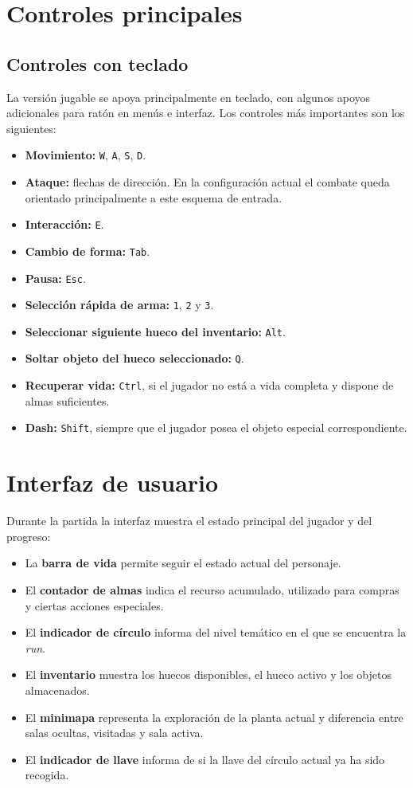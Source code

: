 \section{Controles principales}
\subsection{Controles con teclado}
La versión jugable se apoya principalmente en teclado, con algunos apoyos adicionales para
ratón en menús e interfaz. Los controles más importantes son los siguientes:

\begin{itemize}
    \item \textbf{Movimiento:} \texttt{W}, \texttt{A}, \texttt{S}, \texttt{D}.
    \item \textbf{Ataque:} flechas de dirección. En la configuración actual el combate queda orientado principalmente a este esquema de entrada.
    \item \textbf{Interacción:} \texttt{E}.
    \item \textbf{Cambio de forma:} \texttt{Tab}.
    \item \textbf{Pausa:} \texttt{Esc}.
    \item \textbf{Selección rápida de arma:} \texttt{1}, \texttt{2} y \texttt{3}.
    \item \textbf{Seleccionar siguiente hueco del inventario:} \texttt{Alt}.
    \item \textbf{Soltar objeto del hueco seleccionado:} \texttt{Q}.
    \item \textbf{Recuperar vida:} \texttt{Ctrl}, si el jugador no está a vida completa y dispone de almas suficientes.
    \item \textbf{Dash:} \texttt{Shift}, siempre que el jugador posea el objeto especial correspondiente.
\end{itemize}

\section{Interfaz de usuario}
Durante la partida la interfaz muestra el estado principal del jugador y del progreso:

\begin{itemize}
    \item La \textbf{barra de vida} permite seguir el estado actual del personaje.
    \item El \textbf{contador de almas} indica el recurso acumulado, utilizado para compras y ciertas acciones especiales.
    \item El \textbf{indicador de círculo} informa del nivel temático en el que se encuentra la \textit{run}.
    \item El \textbf{inventario} muestra los huecos disponibles, el hueco activo y los objetos almacenados.
    \item El \textbf{minimapa} representa la exploración de la planta actual y diferencia entre salas ocultas, visitadas y sala activa.
    \item El \textbf{indicador de llave} informa de si la llave del círculo actual ya ha sido recogida.
\end{itemize}

